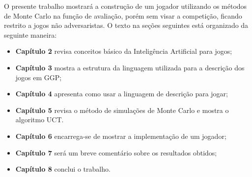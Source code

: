 O presente trabalho mostrará a construção de um jogador utilizando os métodos de Monte Carlo na função de avaliação, porém sem visar a competição, ficando restrito a jogos não adversaristas. O texto na seções seguintes está organizado da seguinte maneira: 
\begin{itemize}
	\item \textbf{Capítulo 2} revisa conceitos básico da Inteligência Artificial para jogos; 
	\item \textbf{Capítulo 3} mostra a estrutura da linguagem utilizada para a descrição dos jogos em GGP;
	\item \textbf{Capítulo 4} apresenta como usar a linguagem de descrição para jogar;
	\item \textbf{Capítulo 5} revisa o método de simulações de Monte Carlo e mostra o algoritmo UCT.
	\item \textbf{Capítulo 6} encarrega-se de mostrar a implementação de um  jogador;
	\item \textbf{Capítulo 7} será um breve comentário sobre os resultados obtidos;
	\item \textbf{Capítulo 8} conclui o trabalho.
\end{itemize}